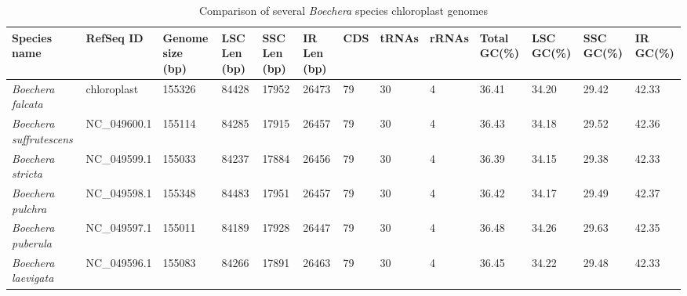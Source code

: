 \documentclass[9pt,twocolumn,twoside,lineno]{gsag3jnl}
\begin{document}
\begin{table}[p]
\centering
\caption{Comparison of several \textit{Boechera} species chloroplast genomes }
\begin{tableminipage}{\textwidth}
\begin{tabularx}{\textwidth}{@{}l l XXXXXXXXXXX@{}}
\hline
\textbf{Species name}           & \textbf{RefSeq ID} & \textbf{Genome size (bp)} & \textbf{LSC Len (bp)} & \textbf{SSC Len (bp)} & \textbf{IR Len (bp)} & \textbf{CDS} & \textbf{tRNAs} & \textbf{rRNAs} & \textbf{Total GC(\%)} & \textbf{LSC GC(\%)} & \textbf{SSC GC(\%)} & \textbf{IR GC(\%)} \\
\hline
\textit{Boechera falcata}       & chloroplast                      & 155326                    & 84428                    & 17952                    & 26473                   & 79           & 30             & 4              & 36.41                        & 34.20               & 29.42               & 42.33              \\
\textit{Boechera suffrutescens} & NC\_049600.1                     & 155114                    & 84285                    & 17915                    & 26457                   & 79           & 30             & 4              & 36.43                        & 34.18               & 29.52               & 42.36              \\
\textit{Boechera stricta}        & NC\_049599.1                     & 155033                    & 84237                    & 17884                    & 26456                   & 79           & 30             & 4              & 36.39                        & 34.15               & 29.38               & 42.33              \\
\textit{Boechera pulchra}       & NC\_049598.1                     & 155348                    & 84483                    & 17951                    & 26457                   & 79           & 30             & 4              & 36.42                        & 34.17               & 29.49               & 42.37              \\
\textit{Boechera puberula}      & NC\_049597.1                     & 155011                    & 84189                    & 17928                    & 26447                   & 79           & 30             & 4              & 36.48                        & 34.26               & 29.63               & 42.35              \\
\textit{Boechera laevigata}     & NC\_049596.1                     & 155083                    & 84266                    & 17891                    & 26463                   & 79           & 30             & 4              & 36.45                        & 34.22               & 29.48               & 42.33              \\

\end{tabularx}
\end{tableminipage}
\end{table}
\end{document}
